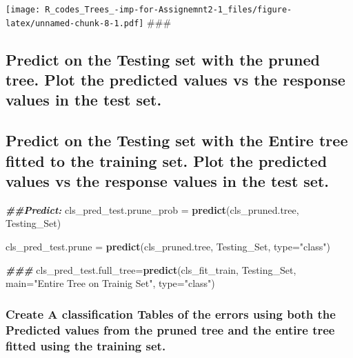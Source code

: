 \documentclass[
]{article}
\newenvironment{Shaded}{\begin{snugshade}}{\end{snugshade}}
\newcommand{\AttributeTok}[1]{\textcolor[rgb]{0.13,0.29,0.53}{#1}}
\newcommand{\DocumentationTok}[1]{\textcolor[rgb]{0.56,0.35,0.01}{\textbf{\textit{#1}}}}
\newcommand{\FunctionTok}[1]{\textcolor[rgb]{0.13,0.29,0.53}{\textbf{#1}}}
\newcommand{\NormalTok}[1]{#1}
\newcommand{\OtherTok}[1]{\textcolor[rgb]{0.56,0.35,0.01}{#1}}
\newcommand{\StringTok}[1]{\textcolor[rgb]{0.31,0.60,0.02}{#1}}
\begin{document}
\texttt{[image: R\_codes\_Trees\_-imp-for-Assignemnt2-1\_files/figure-latex/unnamed-chunk-8-1.pdf]}
\#\#\#

\hypertarget{predict-on-the-testing-set-with-the-pruned-tree.-plot-the-predicted-values-vs-the-response-values-in-the-test-set.}{%
\subsection{Predict on the Testing set with the pruned tree. Plot the
predicted values vs the response values in the test
set.}\label{predict-on-the-testing-set-with-the-pruned-tree.-plot-the-predicted-values-vs-the-response-values-in-the-test-set.}}

\hypertarget{predict-on-the-testing-set-with-the-entire-tree-fitted-to-the-training-set.-plot-the-predicted-values-vs-the-response-values-in-the-test-set.}{%
\subsection{Predict on the Testing set with the Entire tree fitted to
the training set. Plot the predicted values vs the response values in
the test
set.}\label{predict-on-the-testing-set-with-the-entire-tree-fitted-to-the-training-set.-plot-the-predicted-values-vs-the-response-values-in-the-test-set.}}

\begin{Shaded}
\begin{Highlighting}[]
\DocumentationTok{\#\#Predict: }
\NormalTok{cls\_pred\_test.prune\_prob }\OtherTok{=} \FunctionTok{predict}\NormalTok{(cls\_pruned.tree, Testing\_Set)}

\NormalTok{cls\_pred\_test.prune }\OtherTok{=} \FunctionTok{predict}\NormalTok{(cls\_pruned.tree, Testing\_Set, }\AttributeTok{type=}\StringTok{"class"}\NormalTok{)}

\DocumentationTok{\#\#\# }
\NormalTok{cls\_pred\_test.full\_tree}\OtherTok{=}\FunctionTok{predict}\NormalTok{(cls\_fit\_train, Testing\_Set, }\AttributeTok{main=}\StringTok{"Entire Tree on Trainig Set"}\NormalTok{, }\AttributeTok{type=}\StringTok{"class"}\NormalTok{)}
\end{Highlighting}
\end{Shaded}

\hypertarget{section-2}{%
\subsubsection{}\label{section-2}}

\hypertarget{create-a-classification-tables-of-the-errors-using-both-the-predicted-values-from-the-pruned-tree-and-the-entire-tree-fitted-using-the-training-set.}{%
\subsubsection{Create A classification Tables of the errors using both
the Predicted values from the pruned tree and the entire tree fitted
using the training
set.}\label{create-a-classification-tables-of-the-errors-using-both-the-predicted-values-from-the-pruned-tree-and-the-entire-tree-fitted-using-the-training-set.}}
\end{document}
